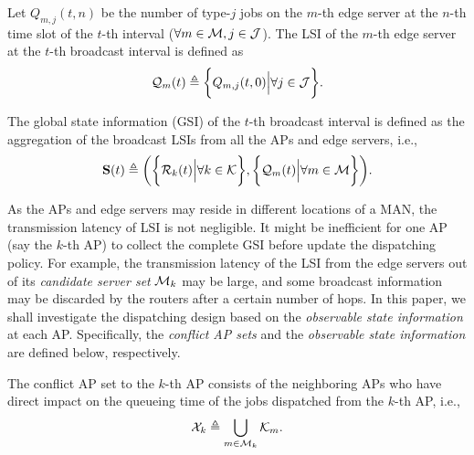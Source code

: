 \begin{definition}
    Let $Q_{m,j}({t,n})$ be the number of type-$j$ jobs on the $m$-th edge server at the $n$-th time slot of the $t$-th interval ($\forall m\in\mathcal{M}, j\in\mathcal{J}$).
    The LSI of the $m$-th edge server at the $t$-th broadcast interval is defined as
    \begin{align}
        \mathcal{Q}_{m}(t) \triangleq \bigg\{
            Q_{m,j}(t, 0) \Big| \forall j\in\mathcal{J}
        \bigg\}.
    \end{align}
\end{definition}

\begin{definition}
    The global state information (GSI) of the $t$-th broadcast interval is defined as the aggregation of the broadcast LSIs from all the APs and edge servers, i.e.,
    \begin{align}
        \mathbf{S}(t) \triangleq
            \bigg(
                \bigg\{\mathcal{R}_{k}(t) \Big| \forall k\in\mathcal{K}\bigg\},
                \bigg\{\mathcal{Q}_{m}(t) \Big| \forall m\in\mathcal{M}\bigg\}
            \bigg).
    \end{align}
\end{definition}

As the APs and edge servers may reside in different locations of a MAN, the transmission latency of LSI is not negligible.
It might be inefficient for one AP (say the $k$-th AP) to collect the complete GSI before update the dispatching policy.
For example, the transmission latency of the LSI from the edge servers out of its \emph{candidate server set} $\mathcal{M}_{k}$ may be large, and some broadcast information may be discarded by the routers after a certain number of hops.
In this paper, we shall investigate the dispatching design based on the \emph{observable state information} at each AP.
Specifically, the \emph{conflict AP sets} and the \emph{observable state information} are defined below, respectively.
\begin{definition}
    The conflict AP set to the $k$-th AP consists of the neighboring APs who have direct impact on the queueing time of the jobs dispatched from the $k$-th AP, i.e.,
    \begin{align}
        \mathcal{X}_{k} \triangleq \bigcup_{m\in\mathcal{M}_{k}} \mathcal{K}_{m}.
    \end{align}
\end{definition}

